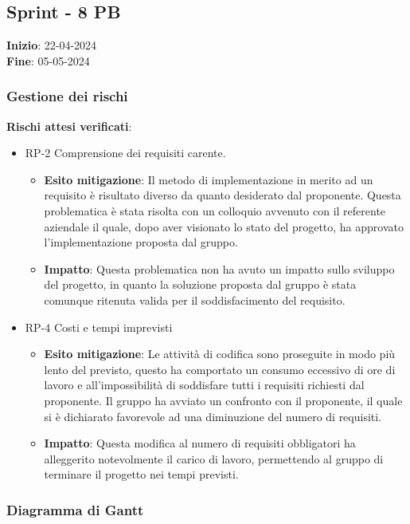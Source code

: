 \subsection{Sprint - 8 PB}
\textbf{Inizio}: 22-04-2024 \\
\textbf{Fine}: 05-05-2024

\subsubsection{Gestione dei rischi}
\textbf{Rischi attesi verificati}:

\begin{itemize}
	\item  RP-2 Comprensione dei requisiti carente.
	      \begin{itemize}
		      \item \textbf{Esito mitigazione}: Il metodo di implementazione in merito ad un requisito è risultato diverso da quanto desiderato dal proponente.
		            Questa problematica è stata risolta con un colloquio avvenuto con il referente aziendale il quale, dopo aver visionato lo stato del progetto, ha approvato l'implementazione proposta dal gruppo.
		      \item \textbf{Impatto}: Questa problematica non ha avuto un impatto sullo sviluppo del progetto, in quanto la soluzione proposta dal gruppo è stata comunque ritenuta valida per il soddisfacimento del requisito.
	      \end{itemize}
	\item RP-4 Costi e tempi imprevisti
	      \begin{itemize}
		      \item \textbf{Esito mitigazione}: Le attività di codifica sono proseguite in modo più lento del previsto, questo ha comportato un consumo eccessivo di ore di lavoro e all'impossibilità di soddisfare tutti i requisiti richiesti dal proponente.
		            Il gruppo ha avviato un confronto con il proponente, il quale si è dichiarato favorevole ad una diminuzione del numero di requisiti.
		      \item \textbf{Impatto}: Questa modifica al numero di requisiti obbligatori ha alleggerito notevolmente il carico di lavoro, permettendo al gruppo di terminare il progetto nei tempi previsti.
	      \end{itemize}
\end{itemize}

\subsubsection{Diagramma di Gantt}

